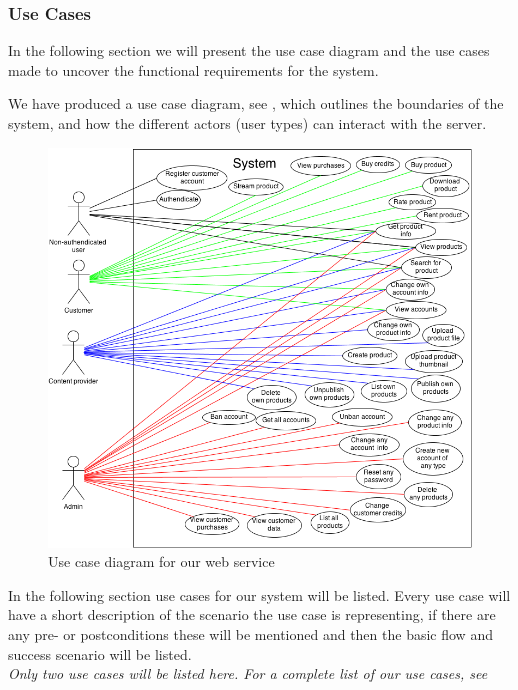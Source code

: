 \subsubsection{Use Cases}
In the following section we will present the use case diagram and the use cases made to uncover the functional requirements for the system.

We have produced a use case diagram, see , which outlines the boundaries of the system, and how the different actors (user types) can interact with the server. 
\begin{figure}[h]
\centering
\includegraphics[scale=0.5]{illustrations/UseCaseDiagram.png}
\caption{Use case diagram for our web service}
\label{useCaseImg}
\end{figure}

In the following section use cases for our system will be listed. Every use case will have a short description of the scenario the use case is representing, if there are any pre- or postconditions these will be mentioned and then the basic flow and success scenario will be listed.\\
\textit{Only two use cases will be listed here. For a complete list of our use cases, see }

